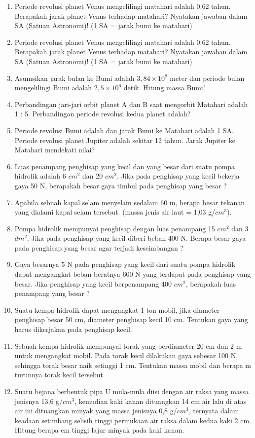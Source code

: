 \documentclass[12pt,a4paper,draft,final,oneside,twoside,openright,openany]{article}
\begin{document}
		
	\begin{enumerate}
		\item Periode revolusi planet Venus mengelilingi 
		matahari adalah 0.62 tahun. Berapakah jarak 
		planet Venus terhadap matahari? Nyatakan 
		jawaban dalam SA (Satuan Astronomi)!       
		(1 SA = jarak bumi ke matahari) 
		\item Periode revolusi planet Venus mengelilingi 
		matahari adalah 0.62 tahun. Berapakah jarak 
		planet Venus terhadap matahari? Nyatakan 
		jawaban dalam SA (Satuan Astronomi)!       
		(1 SA = jarak bumi ke matahari) 
		\item Asumsikan jarak bulan ke Bumi adalah $3,84\times 10^8$ meter dan periode bulan mengelilingi Bumi adalah $2,5\times 10^6$ detik. Hitung massa Bumi!
		\item Perbandingan jari-jari orbit planet A dan B saat mengorbit Matahari adalah 1 : 5. Perbandingan periode revolusi kedua planet adalah?
		\item Periode revolusi Bumi adalah dan jarak Bumi ke Matahari adalah 1 SA. Periode revolusi planet Jupiter adalah sekitar 12 tahun. Jarak Jupiter ke Matahari mendekati nilai?
		\item Luas penampang penghisap yang kecil dan yang besar dari suatu pompa hidrolik adalah 6 $cm^2$ dan 20 $cm^2$. Jika pada penghisap yang kecil bekerja gaya 50 N, berapakah besar gaya timbul pada penghisap yang besar ?
		\item Apabila sebuah kapal selam menyelam sedalam 60 m, berapa besar tekanan yang
		dialami kapal selam tersebut. (massa jenis air laut = 1,03 g/$cm^3$).
		\item Pompa hidrolik mempunyai penghisap dengan luas penampang 15 $cm^2$ dan 3 $dm^2$. Jika pada penghisap yang kecil diberi beban 400 N. Berapa besar gaya pada penghisap yang besar agar terjadi keseimbangan ?
		\item Gaya besarnya 5 N pada penghisap yang kecil dari suatu pompa hidrolik dapat mengangkat beban beratnya 600 N yang terdapat pada penghisap yang besar. Jika penghisap yang kecil berpenampang 400 $cm^2$, berapakah luas penampang yang besar ?
		\item Suatu kempa hidrolik dapat mengangkat 1 ton mobil, jika diameter penghisap besar 50 cm, diameter penghisap kecil 10 cm. Tentukan gaya yang harus dikerjakan pada penghisap kecil.
		\item Sebuah kempa hidrolik mempunyai torak yang berdiameter 20 cm dan 2 m untuk mengangkat mobil. Pada torak kecil dilakukan gaya sebesar 100 N, sehingga torak besar naik setinggi 1 cm. Tentukan massa mobil dan berapa m turunnya torak kecil tersebut
		\item Suatu bejana berbentuk pipa U mula-mula diisi dengan air raksa yang massa jenisnya 13,6 g/$cm^3$, kemudian kaki kanan dituangkan 14 cm air lalu di atas air ini dituangkan minyak yang massa jenisnya 0,8 g/$cm^3$, ternyata dalam keadaan setimbang selisih tinggi permukaan air raksa dalam kedua kaki 2 cm. Hitung berapa cm tinggi lajur minyak pada kaki kanan.
		

\end{enumerate}
\end{document}
